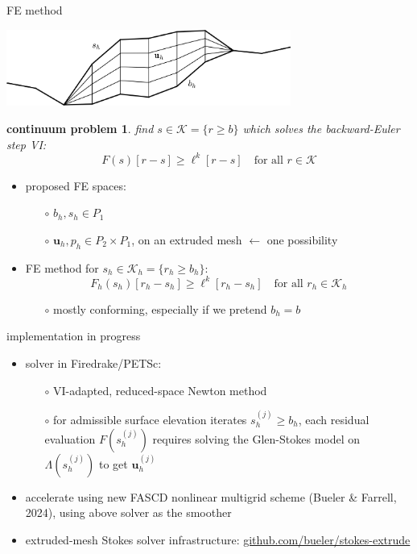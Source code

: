 \documentclass[10pt,dvipsnames]{beamer}
\theoremstyle{theorem}
\newtheorem*{cproblem}{continuum problem}
\newcommand{\bu}{\mathbf{u}}
\newcommand{\cK}{\mathcal{K}}
\begin{document}
\begin{frame}{FE method}

\begin{center}
\includegraphics[width=0.7\textwidth]{extruded}
\end{center}

\begin{cproblem}
find $s\in\cK = \{r \ge b\}$ which solves the backward-Euler step VI:
   $$F(s)[r-s] \ge \ell^k[r-s] \quad \text{for all } r \in \cK$$
\end{cproblem}

\begin{itemize}
\item proposed FE spaces:
   \begin{itemize}
   \item[$\circ$] $b_h,s_h \in P_1$
   \item[$\circ$] $\bu_h,p_h \in P_2 \times P_1$, on an extruded mesh \hfill {\scriptsize $\leftarrow$ one possibility}
   \end{itemize}
\item FE method for $s_h\in\cK_h = \{r_h \ge b_h\}$:
   $$F_h(s_h)[r_h-s_h] \ge \ell^k[r_h-s_h] \quad \text{for all } r_h \in \cK_h$$

   \begin{itemize}
   \item[$\circ$] mostly conforming, especially if we pretend $b_h=b$
   \end{itemize}
\end{itemize}

\phantom{x}
\end{frame}


\begin{frame}{implementation in progress}

\begin{itemize}
\item solver in Firedrake/PETSc:
    \begin{itemize}
    \item[$\circ$] VI-adapted, reduced-space Newton method
    \item[$\circ$] for admissible surface elevation iterates $s_h^{(j)} \ge b_h$, each residual evaluation $F(s_h^{(j)})$ requires solving the Glen-Stokes model on $\Lambda(s_h^{(j)})$ to get $\bu_h^{(j)}$
    \end{itemize}
\item accelerate using new FASCD nonlinear multigrid scheme (Bueler \& Farrell, 2024), using above solver as the smoother
\item extruded-mesh Stokes solver infrastructure: \href{https://github.com/bueler/stokes-extrude}{github.com/bueler/stokes-extrude}
\end{itemize}

\bigskip
\end{frame}
\end{document}
